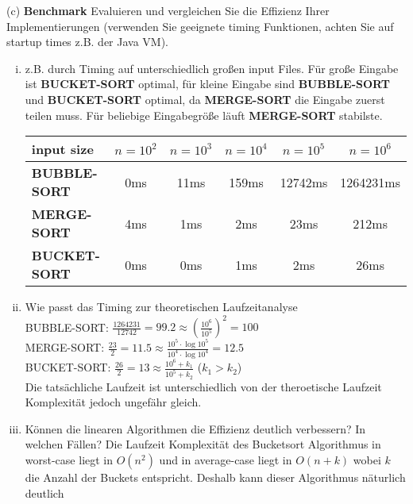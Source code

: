 \documentclass{article}
\begin{document}
\begin{flushleft}
\begin{enumerate}[(i)]
\end{enumerate}
(c) \textbf{Benchmark}
\newline
Evaluieren und vergleichen Sie die Effizienz Ihrer Implementierungen (verwenden Sie geeignete
timing Funktionen, achten Sie auf startup times z.B. der Java VM).
\begin{enumerate}[(i)]
    \item z.B. durch Timing auf unterschiedlich großen input Files.
    \newline
    Für große Eingabe ist \textbf{BUCKET-SORT} optimal, für kleine Eingabe sind \textbf{BUBBLE-SORT} und \textbf{BUCKET-SORT} 
    optimal, da \textbf{MERGE-SORT} die Eingabe zuerst teilen muss. Für beliebige Eingabegröße läuft \textbf{MERGE-SORT} stabilste. 
    \newline
    \begin{tabular}{||l|c|c|c|c|c||}
    \hline input size & $n = 10^2$ & $n = 10^3$ & $n = 10^4$ & $n = 10^5$ & $n = 10^6$ \\
    \hline \textbf{BUBBLE-SORT} & 0ms & 11ms & 159ms & 12742ms & 1264231ms \\
    \hline \textbf{MERGE-SORT} & 4ms & 1ms & 2ms & 23ms & 212ms \\
    \hline \textbf{BUCKET-SORT} & 0ms & 0ms & 1ms & 2ms & 26ms \\
    \hline
    \end{tabular}
    \item Wie passt das Timing zur theoretischen Laufzeitanalyse
    \newline \\
    BUBBLE-SORT: $\displaystyle\frac{1264231}{12742} = 99.2 \approx (\frac{10^6}{10^5})^2 = 100$ \\
    MERGE-SORT: $\displaystyle\frac{23}{2} = 11.5 \approx \frac{10^5 \cdot \log 10^5}{10^4 \cdot \log 10^4} = 12.5$ \\
    BUCKET-SORT: $\displaystyle\frac{26}{2} = 13 \approx \frac{10^6 + k_1}{10^5 + k_2}$ ($k_1 > k_2$) \\
    Die tatsächliche Laufzeit ist unterschiedlich von der theroetische Laufzeit Komplexität jedoch ungefähr gleich.
    \newpage  
    \item Können die linearen Algorithmen die Effizienz deutlich verbessern? In welchen Fällen?
    \newline
    Die Laufzeit Komplexität des Bucketsort Algorithmus in worst-case liegt in $O(n^2)$ und in average-case liegt
    in $O(n + k)$ wobei $k$ die Anzahl der Buckets entspricht. Deshalb kann dieser Algorithmus näturlich deutlich 

\end{enumerate}
\end{flushleft}
\end{document}
